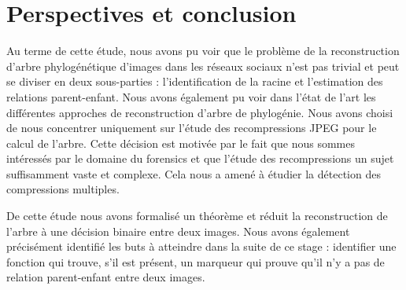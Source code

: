 \documentclass[utf8,final]{stageM2R} %
\begin{document}
\chapter{Perspectives et conclusion}
\label{chap5}
Au terme de cette étude, nous avons pu voir que le problème de la reconstruction d'arbre phylogénétique d'images dans les réseaux sociaux n'est pas trivial et peut se diviser en deux sous-parties : l'identification de la racine et l'estimation des relations parent-enfant. Nous avons également pu voir dans l'état de l'art les différentes approches de reconstruction d'arbre de phylogénie. Nous avons choisi de nous concentrer uniquement sur l'étude des recompressions JPEG pour le calcul de l'arbre. Cette décision est motivée par le fait que nous sommes intéressés par le domaine du forensics et que l'étude des recompressions un sujet suffisamment vaste et complexe. Cela nous a amené à étudier la détection des compressions multiples.

De cette étude nous avons formalisé un théorème et réduit la reconstruction de l'arbre à une décision binaire entre deux images. Nous avons également précisément identifié les buts à atteindre dans la suite de ce stage : identifier une fonction qui trouve, s'il est présent, un marqueur qui prouve qu'il n'y a pas de relation parent-enfant entre deux images.
\printbibliography
\end{document}
